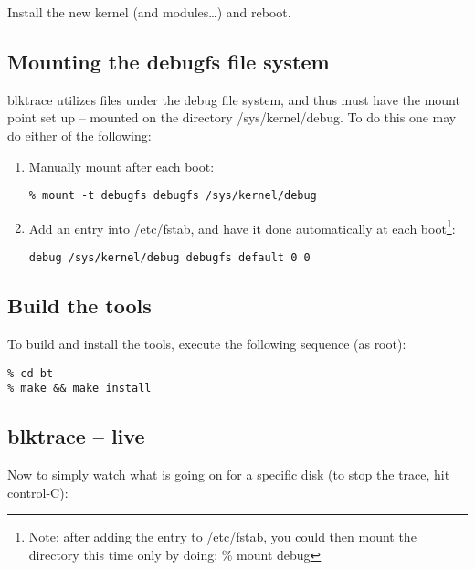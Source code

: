 \documentclass{article}
\begin{document}
Install the new kernel (and modules\ldots) and reboot. 

\subsection{\label{sec:mount}Mounting the debugfs file system}

blktrace utilizes files under the debug file system, and thus must have
the mount point set up -- mounted on the directory /sys/kernel/debug.
To do this one may do either of the following:

\begin{enumerate}
  \item Manually mount after each boot:
\begin{verbatim}
% mount -t debugfs debugfs /sys/kernel/debug
\end{verbatim}

  \item Add an entry into /etc/fstab, and have it done automatically at
  each boot\footnote{Note: after adding the entry to /etc/fstab, you
  could then mount the directory this time only by doing: \% mount debug}:
\begin{verbatim}
debug /sys/kernel/debug debugfs default 0 0
\end{verbatim}
\end{enumerate}

\subsection{\label{sec:build}Build the tools}

To build and install the tools, execute the following sequence (as root):

\begin{verbatim}
% cd bt
% make && make install
\end{verbatim}

\subsection{\label{sec:live-blktrace}blktrace -- live}

Now to simply watch what is going on for a specific disk (to stop the
trace, hit control-C):
\end{document}
